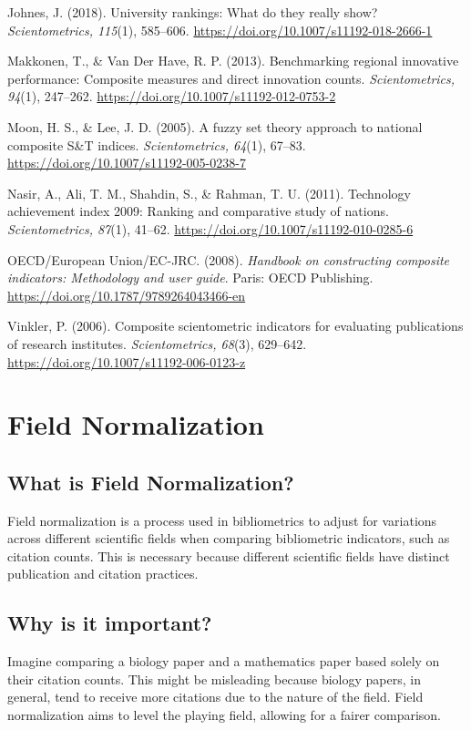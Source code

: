 \documentclass[
  letterpaper,
]{scrreprt}
\begin{document}
Johnes, J. (2018). University rankings: What do they really show?
\emph{Scientometrics, 115}(1), 585--606.
\url{https://doi.org/10.1007/s11192-018-2666-1}

Makkonen, T., \& Van Der Have, R. P. (2013). Benchmarking regional
innovative performance: Composite measures and direct innovation counts.
\emph{Scientometrics, 94}(1), 247--262.
\url{https://doi.org/10.1007/s11192-012-0753-2}

Moon, H. S., \& Lee, J. D. (2005). A fuzzy set theory approach to
national composite S\&T indices. \emph{Scientometrics, 64}(1), 67--83.
\url{https://doi.org/10.1007/s11192-005-0238-7}

Nasir, A., Ali, T. M., Shahdin, S., \& Rahman, T. U. (2011). Technology
achievement index 2009: Ranking and comparative study of nations.
\emph{Scientometrics, 87}(1), 41--62.
\url{https://doi.org/10.1007/s11192-010-0285-6}

OECD/European Union/EC-JRC. (2008). \emph{Handbook on constructing
composite indicators: Methodology and user guide}. Paris: OECD
Publishing. \url{https://doi.org/10.1787/9789264043466-en}

Vinkler, P. (2006). Composite scientometric indicators for evaluating
publications of research institutes. \emph{Scientometrics, 68}(3),
629--642. \url{https://doi.org/10.1007/s11192-006-0123-z}

\chapter{Field Normalization}\label{field-normalization}

\section{What is Field
Normalization?}\label{what-is-field-normalization}

Field normalization is a process used in bibliometrics to adjust for
variations across different scientific fields when comparing
bibliometric indicators, such as citation counts. This is necessary
because different scientific fields have distinct publication and
citation practices.

\section{Why is it important?}\label{why-is-it-important-5}

Imagine comparing a biology paper and a mathematics paper based solely
on their citation counts. This might be misleading because biology
papers, in general, tend to receive more citations due to the nature of
the field. Field normalization aims to level the playing field, allowing
for a fairer comparison.
\end{document}
